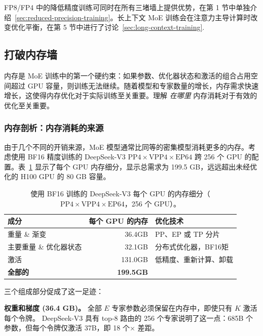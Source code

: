 \documentclass[10pt,logo,copyright]{nvidiatechreport_zh}
\begin{document}
FP8/FP4 中的降低精度训练可同时在所有三堵墙上提供优势，在第 1 节中单独介绍~\ref{sec:reduced-precision-training}。长上下文 MoE 训练会在注意力主导计算时改变优化平衡，在第 5 节中进行了讨论~\ref{sec:long-context-training}.

\subsection{打破内存墙}\label{sec:memory-wall}

内存是 MoE 训练中的第一个硬约束：如果参数、优化器状态和激活的组合占用空间超过 GPU 容量，则训练无法继续。随着模型和专家数量的增长，内存需求快速增长，这使得内存优化对于实际训练至关重要。理解 \emph{在哪里} 内存消耗对于有效的优化至关重要。

\subsubsection{内存剖析：内存消耗的来源}

由于几个不同的开销来源，MoE 模型通常比同等的密集模型消耗更多的内存。考虑使用 BF16 精度训练的 DeepSeek-V3 $\text{PP}4 \times \text{VPP}4 \times \text{EP}64$ 跨 256 个 GPU 的配置。表~\ref{tab:memory-breakdown} 显示了每个 GPU 内存细分，显示总需求为 199.5 GB，远远超出未经优化的 H100 GPU 的 80 GB 容量。

\begin{table}[ht]
\centering
\caption{使用 BF16 训练的 DeepSeek-V3 每个 GPU 的内存细分（$\text{PP}4 \times \text{VPP}4 \times \text{EP}64$，256 个 GPU）。}
\label{tab:memory-breakdown}
\begin{tabular}{lrl}
\toprule
\textbf{成分} & \textbf{每个 GPU 的内存} & \textbf{优化技术} \\
\midrule
重量 \& 渐变 & 36.4GB & PP、EP 或 TP 分片 \\
主要重量 \& 优化器状态 & 32.1GB & 分布式优化器，BF16矩 \\
激活 & 131.0GB & 低精度、重新计算、卸载 \\
\midrule
\textbf{全部的} & \textbf{199.5GB} & \\
\bottomrule
\end{tabular}
\end{table}

三个组成部分促成了这一足迹：

\textbf{权重和梯度 (36.4 GB)。} 全部 $E$ 专家参数必须保留在内存中，即使只有 $K$ 激活每个令牌。 DeepSeek-V3 具有 top-8 路由的 256 个专家说明了这一点：685B 个参数，但每个令牌仅激活 37B，即 18 个$\times$ 差距。
\end{document}
